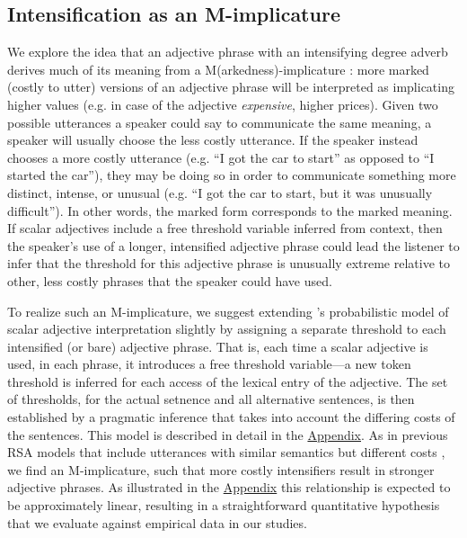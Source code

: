 \documentclass[10pt,letterpaper]{article}
\newcommand{\w}[1]{\emph{#1}}
\begin{document}
\subsection{Intensification as an M-implicature}

We explore the idea that an adjective phrase with an intensifying degree adverb derives much of its meaning from a M(arkedness)-implicature \cite{levinson_presumptive_2000}: more marked (costly to utter) versions of an adjective phrase will be interpreted as implicating higher values (e.g. in case of the adjective \w{expensive}, higher prices). 
Given two possible utterances a speaker could say to communicate the same meaning, a speaker will usually choose the less costly utterance.
If the speaker instead chooses a more costly utterance (e.g. ``I got the car to start'' as opposed to ``I started the car''), they may be doing so in order to communicate something more distinct, intense, or unusual (e.g. ``I got the car to start, but it was unusually difficult'').
In other words, the marked form corresponds to the marked meaning.
If scalar adjectives include a free threshold variable inferred from context, then the speaker's use of a longer, intensified adjective phrase could lead the listener to infer that the threshold for this adjective phrase is unusually extreme relative to other, less costly phrases that the speaker could have used. 

To realize such an M-implicature, we suggest extending 's probabilistic model of scalar adjective interpretation slightly by assigning a separate threshold to each intensified (or bare) adjective phrase.
That is, each time a scalar adjective is used, in each phrase, it introduces a free threshold variable---a new token threshold is inferred for each access of the lexical entry of the adjective.
The set of thresholds, for the actual setnence and all alternative sentences, is then established by a pragmatic inference that takes into account the differing costs of the sentences.
This model is described in detail in the \hyperref[app:model]{Appendix}.
As in previous RSA models that include utterances with similar semantics but different costs \cite{bergen_thats_2012, bergen_pragmatic_2014}, we find an M-implicature, such that more costly intensifiers result in stronger adjective phrases.
As illustrated in the \hyperref[app:model]{Appendix} this relationship is expected to be approximately linear, resulting in a straightforward quantitative hypothesis that we evaluate against empirical data in our studies.
\end{document}
